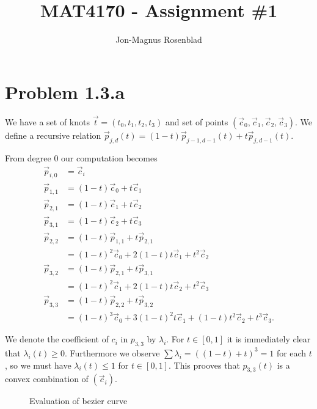 \documentclass{article}
\author{Jon-Magnus Rosenblad}
\title{MAT4170 \-- Assignment \#1}
\begin{document}
\maketitle

\section*{Problem 1.3.a}

We have a set of knots $\vec t = (t_0, t_1, t_2, t_3)$
and set of points $(\vec c_0, \vec c_1, \vec c_2, \vec c_3)$.
We define a recursive relation 
$\vec p_{j,d}(t) = (1 - t) \vec p_{j - 1, d - 1}(t)
+ t \vec p_{j, d - 1}(t)$.

From degree $0$ our computation becomes
\begin{equation*}
\begin{aligned}
    \vec p_{i,0} &= \vec c_i\\
    \vec p_{1,1} &= (1 - t)\vec c_0 + t\vec c_1\\
    \vec p_{2,1} &= (1 - t)\vec c_1 + t\vec c_2\\
    \vec p_{3,1} &= (1 - t)\vec c_2 + t\vec c_3\\
    \vec p_{2,2} &= (1 - t)\vec p_{1,1} + t\vec p_{2,1}\\
    &= (1 - t)^2\vec c_0 + 2(1 - t)t\vec c_1 + t^2\vec c_2\\
    \vec p_{3,2} &= (1 - t)\vec p_{2,1} + t\vec p_{3,1}\\
    &= (1 - t)^2\vec c_1 + 2(1 - t)t\vec c_2 + t^2\vec c_3\\
    \vec p_{3,3} &= (1 - t)\vec p_{2,2} + t\vec p_{3,2}\\
    &= (1 - t)^3\vec c_0 + 3(1 - t)^2t \vec c_1
    + (1 - t)t^2\vec c_2 + t^3\vec c_3.
\end{aligned}
\end{equation*}

We denote the coefficient of $c_i$ in $p_{3,3}$ by $\lambda_i$.
For $t\in[0,1]$ it is immediately clear that $\lambda_i(t)\geq 0$.
Furthermore we observe $\sum\lambda_i = ((1 - t) + t)^3 = 1$ for each $t$,
so we must have $\lambda_i(t)\leq 1$ for $t\in [0,1]$.
This prooves that $p_{3,3}(t)$ is a convex combination of $(\vec c_i)$.

\begin{figure}
    \centering
    
    \caption{Evaluation of bezier curve}
\end{figure}



\end{document}
